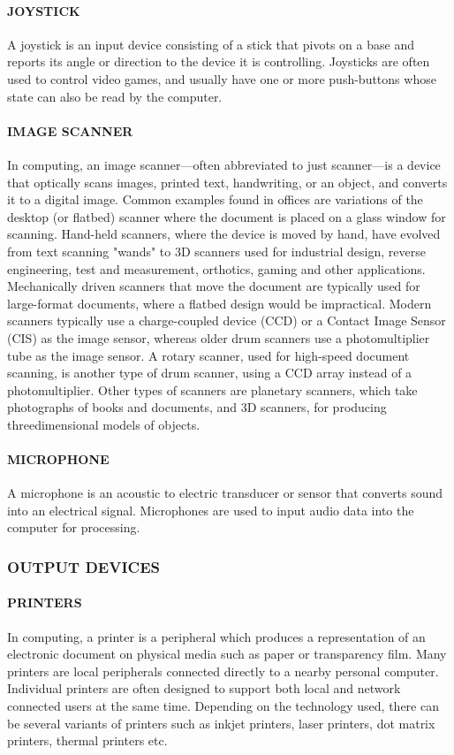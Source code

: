 	\paragraph* {JOYSTICK}
	 A joystick is an input device consisting of a stick that pivots on a base and reports its angle or
	direction to the device it is controlling. Joysticks are often used to control video games, and usually
	have one or more push-buttons whose state can also be read by the computer.
	\paragraph* {IMAGE SCANNER}
	 In computing, an image scanner—often abbreviated to just scanner—is a device that
	optically scans images, printed text, handwriting, or an object, and converts it to a digital image.
	Common examples found in offices are variations of the desktop (or flatbed) scanner where the
	document is placed on a glass window for scanning. Hand-held scanners, where the device is moved by
		hand, have evolved from text scanning "wands" to 3D scanners used for industrial design, reverse
	engineering, test and measurement, orthotics, gaming and other applications. Mechanically driven
	scanners that move the document are typically used for large-format documents, where a flatbed design
	would be impractical. Modern scanners typically use a charge-coupled device (CCD) or a Contact
	Image Sensor (CIS) as the image sensor, whereas older drum scanners use a photomultiplier tube as the
	image sensor. A rotary scanner, used for high-speed document scanning, is another type of drum
	scanner, using a CCD array instead of a photomultiplier. Other types of scanners are planetary
	scanners, which take photographs of books and documents, and 3D scanners, for producing threedimensional
	models of objects.
	\paragraph* {MICROPHONE} 
	A microphone is an acoustic to electric transducer or sensor that converts sound into an
	electrical signal. Microphones are used to input audio data into the computer for processing.
		\subsubsection*{ OUTPUT DEVICES}
		\paragraph*{ PRINTERS}
	 In computing, a printer is a peripheral which produces a representation of an electronic
	document on physical media such as paper or transparency film. Many printers are local peripherals
	connected directly to a nearby personal computer. Individual printers are often designed to support both
	local and network connected users at the same time. Depending on the technology used, there can be
	several variants of printers such as inkjet printers, laser printers, dot matrix printers, thermal printers
	etc.
